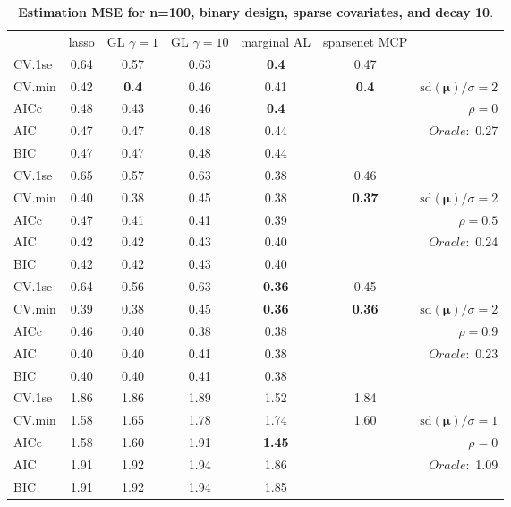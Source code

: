 \clearpage
\begin{table}\vspace{-.5cm}
\caption[l]{ { \bf Estimation MSE for n=100, binary design, 
sparse covariates, and  decay  10}.}
\vspace{-.5cm}
\footnotesize{}
\begin{center}
\begin{tabular}{l*{5}{c}|r}
& lasso & GL $\gamma=1$ & GL $\gamma=10$ & marginal AL & sparsenet MCP  & \\
 \cline{1-7}
CV.1se & 0.64 & 0.57 & 0.63 & {\bf 0.4} & 0.47 & \\
CV.min & 0.42 & {\bf 0.4} & 0.46 & 0.41 & {\bf 0.4} &  $\mathrm{sd}(\mathbf{\mu})/\sigma=2$ \\
AICc & 0.48 & 0.43 & 0.46 & {\bf 0.4} & & $\rho=0$ \\
AIC & 0.47 & 0.47 & 0.48 & 0.44 & &  \multirow{2}{*}{$Oracle: $ 0.27} \\
BIC & 0.47 & 0.47 & 0.48 & 0.44 & &  \\
 \hline 
CV.1se & 0.65 & 0.57 & 0.63 & 0.38 & 0.46 & \\
CV.min & 0.40 & 0.38 & 0.45 & 0.38 & {\bf 0.37} &  $\mathrm{sd}(\mathbf{\mu})/\sigma=2$ \\
AICc & 0.47 & 0.41 & 0.41 & 0.39 & & $\rho=0.5$ \\
AIC & 0.42 & 0.42 & 0.43 & 0.40 & &  \multirow{2}{*}{$Oracle: $ 0.24} \\
BIC & 0.42 & 0.42 & 0.43 & 0.40 & &  \\
 \hline 
CV.1se & 0.64 & 0.56 & 0.63 & {\bf 0.36} & 0.45 & \\
CV.min & 0.39 & 0.38 & 0.45 & {\bf 0.36} & {\bf 0.36} &  $\mathrm{sd}(\mathbf{\mu})/\sigma=2$ \\
AICc & 0.46 & 0.40 & 0.38 & 0.38 & & $\rho=0.9$ \\
AIC & 0.40 & 0.40 & 0.41 & 0.38 & &  \multirow{2}{*}{$Oracle: $ 0.23} \\
BIC & 0.40 & 0.40 & 0.41 & 0.38 & &  \\
 \hline 
CV.1se & 1.86 & 1.86 & 1.89 & 1.52 & 1.84 & \\
CV.min & 1.58 & 1.65 & 1.78 & 1.74 & 1.60 &  $\mathrm{sd}(\mathbf{\mu})/\sigma=1$ \\
AICc & 1.58 & 1.60 & 1.91 & {\bf 1.45} & & $\rho=0$ \\
AIC & 1.91 & 1.92 & 1.94 & 1.86 & &  \multirow{2}{*}{$Oracle: $ 1.09} \\
BIC & 1.91 & 1.92 & 1.94 & 1.85 & &  \\

\end{tabular}
\end{center}
\end{table}
